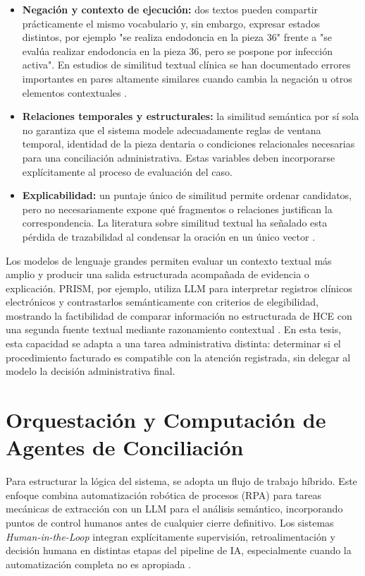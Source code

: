 \begin{itemize}
    \item \textbf{Negación y contexto de ejecución:} dos textos pueden compartir prácticamente el mismo vocabulario y, sin embargo, expresar estados distintos, por ejemplo "se realiza endodoncia en la pieza 36" frente a "se evalúa realizar endodoncia en la pieza 36, pero se pospone por infección activa". En estudios de similitud textual clínica se han documentado errores importantes en pares altamente similares cuando cambia la negación u otros elementos contextuales \cite{chen2021clinicalsts}.
    \item \textbf{Relaciones temporales y estructurales:} la similitud semántica por sí sola no garantiza que el sistema modele adecuadamente reglas de ventana temporal, identidad de la pieza dentaria o condiciones relacionales necesarias para una conciliación administrativa. Estas variables deben incorporarse explícitamente al proceso de evaluación del caso.
    \item \textbf{Explicabilidad:} un puntaje único de similitud permite ordenar candidatos, pero no necesariamente expone qué fragmentos o relaciones justifican la correspondencia. La literatura sobre similitud textual ha señalado esta pérdida de trazabilidad al condensar la oración en un único vector \cite{wang2023token}.
\end{itemize}

Los modelos de lenguaje grandes permiten evaluar un contexto textual más amplio y producir una salida estructurada acompañada de evidencia o explicación. PRISM, por ejemplo, utiliza LLM para interpretar registros clínicos electrónicos y contrastarlos semánticamente con criterios de elegibilidad, mostrando la factibilidad de comparar información no estructurada de HCE con una segunda fuente textual mediante razonamiento contextual \cite{gupta2024prism}. En esta tesis, esta capacidad se adapta a una tarea administrativa distinta: determinar si el procedimiento facturado es compatible con la atención registrada, sin delegar al modelo la decisión administrativa final.

\section{Orquestación y Computación de Agentes de Conciliación}

Para estructurar la lógica del sistema, se adopta un flujo de trabajo híbrido. Este enfoque combina automatización robótica de procesos (RPA) para tareas mecánicas de extracción con un LLM para el análisis semántico, incorporando puntos de control humanos antes de cualquier cierre definitivo. Los sistemas \textit{Human-in-the-Loop} integran explícitamente supervisión, retroalimentación y decisión humana en distintas etapas del pipeline de IA, especialmente cuando la automatización completa no es apropiada \cite{lazaros2026hitl}.

